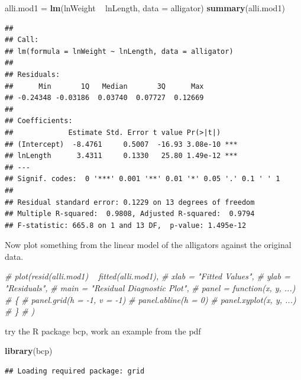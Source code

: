 \documentclass[]{article}
\newenvironment{Shaded}{\begin{snugshade}}{\end{snugshade}}
\newcommand{\KeywordTok}[1]{\textcolor[rgb]{0.13,0.29,0.53}{\textbf{{#1}}}}
\newcommand{\DataTypeTok}[1]{\textcolor[rgb]{0.13,0.29,0.53}{{#1}}}
\newcommand{\StringTok}[1]{\textcolor[rgb]{0.31,0.60,0.02}{{#1}}}
\newcommand{\CommentTok}[1]{\textcolor[rgb]{0.56,0.35,0.01}{\textit{{#1}}}}
\newcommand{\NormalTok}[1]{{#1}}
\begin{document}
\begin{Shaded}
\begin{Highlighting}[]
\NormalTok{alli.mod1 =}\StringTok{ }\KeywordTok{lm}\NormalTok{(lnWeight ~}\StringTok{ }\NormalTok{lnLength, }\DataTypeTok{data =} \NormalTok{alligator)}
\KeywordTok{summary}\NormalTok{(alli.mod1)}
\end{Highlighting}
\end{Shaded}

\begin{verbatim}
## 
## Call:
## lm(formula = lnWeight ~ lnLength, data = alligator)
## 
## Residuals:
##      Min       1Q   Median       3Q      Max 
## -0.24348 -0.03186  0.03740  0.07727  0.12669 
## 
## Coefficients:
##             Estimate Std. Error t value Pr(>|t|)    
## (Intercept)  -8.4761     0.5007  -16.93 3.08e-10 ***
## lnLength      3.4311     0.1330   25.80 1.49e-12 ***
## ---
## Signif. codes:  0 '***' 0.001 '**' 0.01 '*' 0.05 '.' 0.1 ' ' 1
## 
## Residual standard error: 0.1229 on 13 degrees of freedom
## Multiple R-squared:  0.9808, Adjusted R-squared:  0.9794 
## F-statistic: 665.8 on 1 and 13 DF,  p-value: 1.495e-12
\end{verbatim}

Now plot something from the linear model of the alligators against the
original data.

\begin{Shaded}
\begin{Highlighting}[]
\CommentTok{# plot(resid(alli.mod1) ~ fitted(alli.mod1),}
\CommentTok{#   xlab = "Fitted Values",}
\CommentTok{#   ylab = "Residuals",}
\CommentTok{#   main = "Residual Diagnostic Plot",}
\CommentTok{#   panel = function(x, y, ...)}
\CommentTok{#   \{}
\CommentTok{#     panel.grid(h = -1, v = -1)}
\CommentTok{#     panel.abline(h = 0)}
\CommentTok{#     panel.xyplot(x, y, ...)}
\CommentTok{#   \}}
\CommentTok{# )}
\end{Highlighting}
\end{Shaded}

try the R package bcp, work an example from the pdf

\begin{Shaded}
\begin{Highlighting}[]
\KeywordTok{library}\NormalTok{(bcp)}
\end{Highlighting}
\end{Shaded}

\begin{verbatim}
## Loading required package: grid
\end{verbatim}
\end{document}
